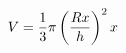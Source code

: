 \documentclass[preview]{standalone}
\begin{document}
\begin{align*}
\special{dvisvgm:raw <g id='unique000'>}V=\frac13\pi\left(\frac{Rx}{h}\right)^2x\special{dvisvgm:raw </g>}
\end{align*}
\end{document}
